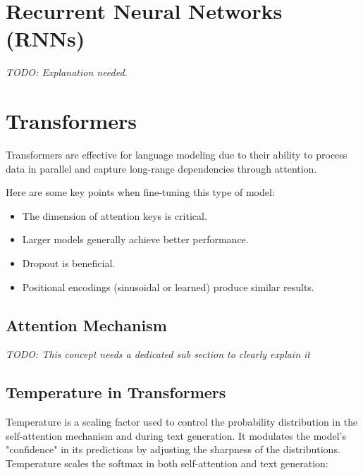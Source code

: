 \documentclass{article}
\begin{document}
\clearpage\newpage

\section{Recurrent Neural Networks (RNNs)}
\textit{TODO: Explanation needed.}

\clearpage\newpage

\section{Transformers}
Transformers are effective for language modeling due to their ability to process data in parallel and capture long-range dependencies through attention.

Here are some key points when fine-tuning this type of model:
\begin{itemize}
    \item The dimension of attention keys is critical.
    \item Larger models generally achieve better performance.
    \item Dropout is beneficial.
    \item Positional encodings (sinusoidal or learned) produce similar results.
\end{itemize}

\subsection{Attention Mechanism}
\textit{TODO: This concept needs a dedicated sub section to clearly explain it}

\subsection{Temperature in Transformers}
Temperature is a scaling factor used to control the probability distribution in the self-attention mechanism and during text generation. It modulates the model’s "confidence" in its predictions by adjusting the sharpness of the distributions. Temperature scales the softmax in both self-attention and text generation:
\end{document}
